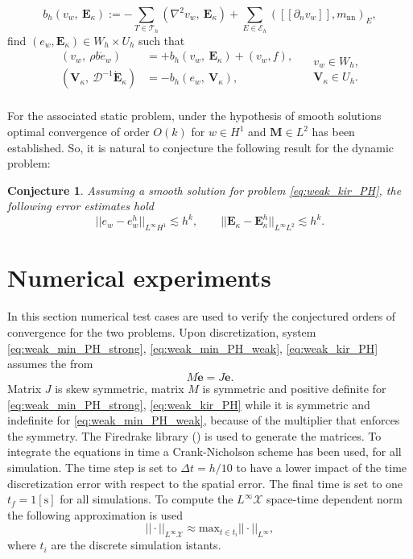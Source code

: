 \documentclass{ifacconf}
\newtheorem{conjecture}{Conjecture}
\begin{document}
\[
b_h(v_w, \ \bm{E}_{\kappa}) := - \sum_{T \in \mathcal{T}_h} ( \nabla^2 v_w, \ \bm{E}_\kappa) + \sum_{E \in \mathcal{E}_h} ([\![\partial_n v_w]\!], m_{\text{nn}})_{E}, 
\]
find $(e_w, \bm{E}_\kappa) \in W_h \times U_h$ such that
\begin{equation}
\label{eq:weak_kir_PH}
\begin{aligned}
(v_w, \ \rho b \dot{e}_w) &= +b_h(v_w, \ \bm{E}_{\kappa}) + (v_w, f), \\ 
(\bm{V}_\kappa, \ \mathcal{D}^{-1} \dot{\bm{E}}_\kappa) &= -b_h(e_w, \ \bm{V}_{\kappa}), \\ 
\end{aligned} \quad
\begin{aligned}
v_w \in W_h, \\
\bm{V}_\kappa \in U_h. \\
\end{aligned}
\end{equation}

For the associated static problem, under the hypothesis of smooth solutions optimal convergence of order $O(k)$ for $w \in H^1$ and $\bm{M} \in L^2$ has been established. So, it is natural to conjecture the following result for the dynamic problem:
\begin{conjecture}
Assuming a smooth solution for problem \eqref{eq:weak_kir_PH}, the following error estimates hold
\begin{equation}
\label{eq:errHHJ}
||e_w - e_w^h||_{L^{\infty} H^1} \lesssim h^{k}, \qquad
||\bm{E}_\kappa - \bm{E}_\kappa^h||_{L^{\infty} L^2} \lesssim h^{k}.
\end{equation}
\end{conjecture}


\section{Numerical experiments}
\label{sec:numerics}
In this section numerical test cases are used to verify the conjectured orders of convergence for the two problems. Upon discretization, system \eqref{eq:weak_min_PH_strong}, \eqref{eq:weak_min_PH_weak}, \eqref{eq:weak_kir_PH} assumes the from 
\[
M \dot{\bm{e}} = J \bm{e}.
\]
Matrix $J$ is skew {\tiny }symmetric, matrix $M$ is symmetric and positive definite for \eqref{eq:weak_min_PH_strong}, \eqref{eq:weak_kir_PH} while it is symmetric and indefinite for \eqref{eq:weak_min_PH_weak}, because of the multiplier that enforces the symmetry. The Firedrake library (\cite{rathgeber2017firedrake}) is used to generate the matrices. To integrate the equations in time a Crank-Nicholson scheme has been used, for all simulation. The time step is set to $\Delta t = h/10$ to have a lower impact of the time discretization error with respect to the spatial error. The final time is set to one $t_f = 1 [\textrm{s}]$ for all simulations. To compute the $L^\infty \mathcal{X}$ space-time dependent norm  the following approximation is used
\[
||\cdot ||_{L^\infty \mathcal{X}} \approx \mathrm{max}_{t \in t_i} ||\cdot||_{L^\infty},
\]
where $t_i$ are the discrete simulation istants. 
\end{document}
